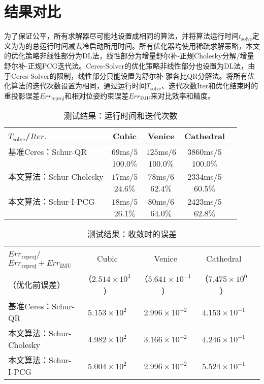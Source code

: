 \section{结果对比}

为了保证公平，所有求解器尽可能地设置成相同的算法，并将算法运行时间$t_{\text{solve}}$定义为为的总运行时间减去冷启动所用时间。所有优化器均使用稀疏求解策略，本文的优化策略非线性部分为DL法，线性部分为增量舒尔补-正规Cholesky分解/增量舒尔补-正规PCG迭代法。Ceres-Solver的优化策略非线性部分也设置为DL法，由于Ceres-Solver的限制，线性部分只能设置为舒尔补-雅各比QR分解法。将所有优化算法的迭代次数设置为相同，通过运行时间$T_{\text{solve}}$、迭代次数Iter和优化结束时的重投影误差$Err_{\text{reproj}}$和相对位姿约束误差$Err_{\text{IMU}}$来对比效率和精度。

{
\linespread{1}
\begin{table}[htb!]
\caption{测试结果：运行时间和迭代次数}
\label{tab:time}
\centering
\begin{tabular}[b]{l|cccc}
    \toprule
    $T_{\text{solve}}$/$Iter.$ &      Cubic & Venice      &    Cathedral \\ \midrule
    基准Ceres：Schur-QR        & $69$ms/$5$ & $125$ms/$6$ & $3860$ms/$5$ \\
                               &  $100.0\%$ & $100.0\%$   &    $100.0\%$ \\ \midrule
    本文算法：Schur-Cholesky   & $17$ms/$5$ & $78$ms/$6$  & $2334$ms/$5$ \\
                               &   $24.6\%$ & $62.4\%$    &     $60.5\%$ \\ \midrule
    本文算法：Schur-I-PCG      & $18$ms/$5$ & $80$ms/$6$  & $2423$ms/$5$ \\
                               &   $26.1\%$ & $64.0\%$    &     $62.8\%$ \\
    \bottomrule
\end{tabular}
\end{table}
}

{
\linespread{1}
\begin{table}[htb!]
\caption{测试结果：收敛时的误差}
\label{tab:energy}
\centering
\begin{tabular}[b]{l|cccc}
    \toprule $Err_{\text{reproj}}$/
    $Err_{\text{reproj}}+Err_{\text{IMU}}$ &                 Cubic & Venice                   &               Cathedral \\
    （优化前误差）                         & （$2.514\times10^3$） & （$5.641\times10^{-1}$） & （$7.475\times10^{0}$） \\ \midrule
    基准Ceres：Schur-QR                    &     $5.153\times10^2$ & $2.996\times10^{-2}$     &    $4.153\times10^{-1}$ \\
    本文算法：Schur-Cholesky               &     $4.982\times10^2$ & $3.166\times10^{-2}$     &    $4.246\times10^{-1}$ \\
    本文算法：Schur-I-PCG                  &     $5.004\times10^2$ & $2.996\times10^{-2}$     &    $5.524\times10^{-1}$ \\
    \bottomrule
\end{tabular}
\end{table}
}

